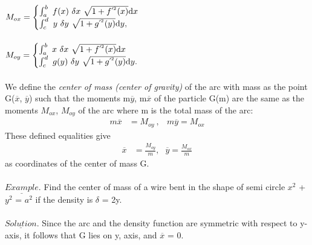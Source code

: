 \documentclass{book}
\begin{document}
	\paragraph{}$M_{ox} = 
	\begin{cases}	\int_{a}^{b} \  f(x) \ \delta{x} \ \sqrt{1 + f^{'^{2}}(x)}\mathrm{d} {x} \\ \int_{c}^{d} \  y \ \delta{y} \ \sqrt{1 + g^{'^{2}}(y)}\mathrm{d} {y}, \\ \end{cases}$ \\ 
	\paragraph{}$M_{oy} = \begin{cases} \int_{a}^{b} \ x \ \delta{x} \ \sqrt{1 + f^{'^{2}}(x)}\hDif {x} \\ \int_{c}^{d} \ g(y) \ \delta{y} \ \sqrt{1 + g^{'^{2}}(y)}\hDif {y}. \\ 
	\end{cases}$
	\paragraph{}We define the \textit{center of mass (center of gravity)} of the arc with mass as the point G($\overline{x}$, $\overline{y}$) such that the moments m$\overline{y}$, m$\overline{x}$ of the particle G(m) are the same as the moments $M_{ox}$, $M_{oy}$ of the arc where m is the total mass of the arc:
	\begin{align*}
		m \overline{x} &= M_{oy} \ ,  &m\overline{y}= M_{ox}
	\end{align*}
	These defined equalities give
	\begin{align*}
		  \overline{x} &= \frac{M_{oy}}{m}  \text{,}   &\overline{y} = \frac{M_{ox}}{m}
	\end{align*}
	as coordinates of the center of mass G. 
	\paragraph{}$\underline{Example}$. Find the center of mass of a wire bent in the shape of semi circle $x^{2}$ + $y^{2}$ = $a^{2}$ if the density is $\delta{}$ = 2y. \paragraph{}$\underline{Solution}$. Since the arc and the density function are symmetric with respect to y-axis, it follows that G lies on y, axis, and $\overline{x}$ = 0.
\end{document}
